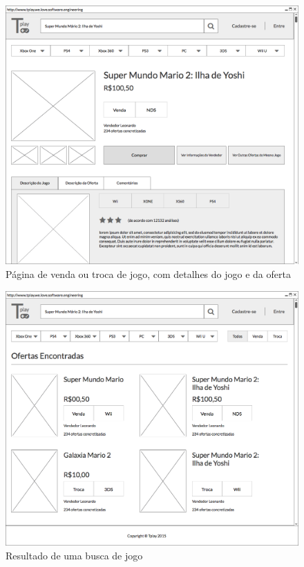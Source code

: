 \documentclass[a4paper,11pt]{article}
\begin{document}
\begin{figure}[!H]
    		\centering
        	\includegraphics[width=\textwidth,height=\dimexpr\textheight-3\baselineskip\relax,keepaspectratio]{Detalhe.png}
        	\caption{Página de venda ou troca de jogo, com detalhes do jogo e da oferta}
     		\label{detalhe}
\end{figure}

\begin{figure}[!H]
    		\centering
        	\includegraphics[width=\textwidth,height=\dimexpr\textheight-3\baselineskip\relax,keepaspectratio]{Busca.png}
        	\caption{Resultado de uma busca de jogo}
     		\label{diagrama}
\end{figure}
\end{document}
